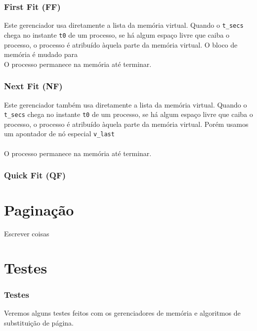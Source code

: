 \documentclass{beamer}
\begin{document}

\begin{frame}
  \frametitle{First Fit (FF)}
  Este gerenciador usa diretamente a lista da memória virtual. Quando o \texttt{t_secs} chega no instante \texttt{t0} de um processo, se há algum espaço livre que caiba o processo, o processo é atribuído àquela parte da memória virtual.
  O bloco de memória é mudado para \\

  O processo permanece na memória até terminar.
\end{frame}


\begin{frame}
  \frametitle{Next Fit (NF)}
  Este gerenciador também usa diretamente a lista da memória virtual. Quando o \texttt{t_secs} chega no instante \texttt{t0} de um processo, se há algum espaço livre que caiba o processo, o processo é atribuído àquela parte da memória virtual. Porém usamos um apontador de nó especial \texttt{v_last}  \\~\\

  O processo permanece na memória até terminar.
\end{frame}


\begin{frame}
  \frametitle{Quick Fit (QF)}
  
\end{frame}

\section{Paginação}

\begin{frame}
Escrever coisas
\end{frame}

\section{Testes}

\begin{frame}
  \frametitle{Testes}
  Veremos alguns testes feitos com os gerenciadores de memória e algoritmos de substituição de página.
\end{frame}
\end{document}
